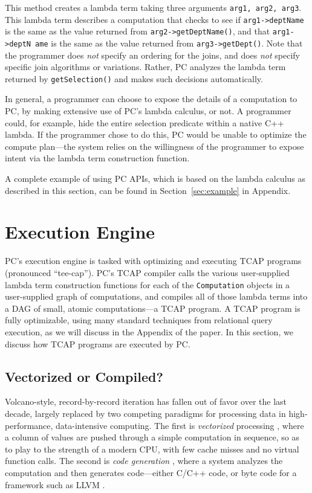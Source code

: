 \noindent
This method creates a lambda term taking three arguments \texttt{arg1, arg2, arg3}.  This lambda term describes a computation that
checks to see if \texttt{arg1->deptName} is the same as the value
returned from \texttt{arg2->getDeptName()}, and
that \texttt{arg1->deptN ame} is the same as the value returned from \texttt{arg3}\-\texttt{->getDept()}. 
Note that the programmer does \emph{not} specify an ordering for the joins, and does \emph{not} specify specific join algorithms or variations.  Rather, PC
analyzes the lambda term returned by \texttt{getSelection()} and
makes such decisions automatically.

In general, a programmer can choose to expose the details of a computation to PC, by making extensive use of PC's lambda
calculus, or not.  A programmer could, for example, hide the entire selection predicate within a native C++ lambda.
If the programmer chose to do this, PC would be unable to optimize the compute plan---the system relies on the willingness of the 
programmer to expose intent via the lambda term construction function.

\vspace{5pt}
A complete example of using PC APIs, which is based on the lambda
calculus as described in this section, can be found in
Section~\ref{sec:example} in Appendix.

\section{Execution Engine}
\label{sec:engine}

PC's execution engine is tasked with optimizing and executing TCAP programs (pronounced ``tee-cap'').  
PC's TCAP compiler
calls the various user-supplied lambda term construction functions for each of the \texttt{Computation} objects in a
user-supplied graph of computations,
and compiles all of those lambda terms into a DAG of small, atomic computations---a TCAP program.
A TCAP program is fully optimizable, using many standard techniques from relational query execution, as we
will discuss in the Appendix of the paper.
In this section, we discuss how TCAP programs are executed by PC.

\subsection{Vectorized or Compiled?}
Volcano-style, record-by-record iteration \cite{graefe1990encapsulation} has fallen out of favor over the last decade, largely replaced by
two competing paradigms for processing data
in high-performance, data-intensive computing.  The first is \emph{vectorized} processing \cite{abadi2009column, boncz2005monetdb, zukowski2005monetdb, idreos2012monetdb}, where a column of values are pushed
through a simple computation in sequence, so as to play to the strength of a modern CPU, with few cache misses and no virtual
function calls.  The second is \emph{code generation} \cite{neumann2011efficiently, nagel2014code, bress2017generating, klonatos2014building, ahmad2009dbtoaster}, where a system analyzes the computation
and then generates code---either C/C++ code, or byte code for a framework such as LLVM \cite{lattner2004llvm, lattner2002llvm}.


